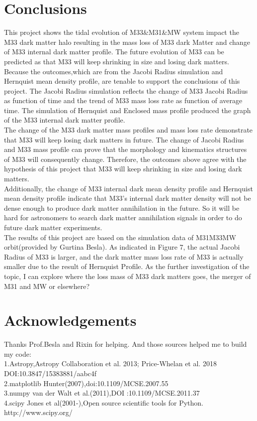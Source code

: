 \documentclass[twocolumn]{aastex63}
\begin{document}
\section{Conclusions}
This project shows the tidal evolution of M33&M31&MW system impact the M33 dark matter halo resulting in the mass loss of M33 dark Matter and change of M33 internal dark matter profile. The future evolution of M33 can be predicted as that M33 will keep shrinking in size and losing dark matters. Because the outcomes,which are from the Jacobi Radius simulation and Hernquist mean density profile, are tenable to support the conclusions of this project. The Jacobi Radius simulation reflects the change of M33 Jacobi Radius as function of time and the trend of M33 mass loss rate as function of average time. The simulation of Hernquist and Enclosed mass profile produced the graph of the M33 internal dark matter profile.     \\
\indent The change of the M33 dark matter mass profiles and mass loss rate demonstrate that M33 will keep losing dark matters in future. The change of Jacobi Radius and M33 mass profile can prove that the morphology and kinematics structures of M33 will consequently change. Therefore, the outcomes above agree with the hypothesis of this project that M33 will keep shrinking in size and losing dark matters.\\
\indent Additionally, the change of M33 internal dark mean density profile and Hernquist mean density profile indicate that M33's internal dark matter density will not be dense enough to produce dark matter annihilation in the future. So it will be hard for astronomers to search dark matter annihilation signals in order to do future dark matter experiments. \\
\indent The results of this project are based on the simulation data of M31M33MW orbit(provided by Gurtina Besla). As indicated in Figure 7, the actual Jacobi Radius of M33 is larger, and the dark matter mass loss rate of M33 is actually smaller due to the result of Hernquist Profile. As the further investigation of the topic, I can explore where the loss mass of M33 dark matters goes, the merger of M31 and MW or elsewhere? 
\section{Acknowledgements}
Thanks Prof.Besla and Rixin for helping. And those sources helped me to build my code:\\
\indent 1.Astropy,Astropy Collaboration et al. 2013; Price-Whelan et al. 2018 DOI:10.3847/15383881/aabc4f\\
\indent 2.matplotlib Hunter(2007),doi:10.1109/MCSE.2007.55\\
\indent 3.numpy van der Walt et al.(2011),DOI
:10.1109/MCSE.2011.37\\
\indent 4.scipy Jones et al(2001-),Open source scientific tools for Python. http://www.scipy.org/

{}

\end{document}
